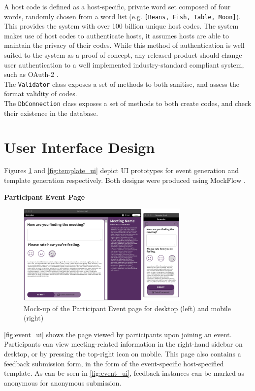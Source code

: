 \documentclass[9pt, titlepage]{extarticle}
\begin{document}
A host code is defined as a host-specific, private word set composed of four words, randomly chosen from a word list (e.g. \texttt{[Beans, Fish, Table, Moon]}). 
This provides the system with over 100 billion unique host codes. 
The system makes use of host codes to authenticate hosts, it assumes hosts are able to maintain the privacy of their codes.
While this method of authentication is well suited to the system as a proof of concept, any released product should change user authentication to a well implemented industry-standard compliant system, such as OAuth-2 \autocite{web:oauth}.\\

The \texttt{Validator} class exposes a set of methods to both sanitise, and assess the format validity of codes. \\
The \texttt{DbConnection} class exposes a set of methods to both create codes, and check their existence in the database.

\section{User Interface Design}

Figures \ref{fig:event_ui} and \ref{fig:template_ui} depict UI prototypes for event generation and template generation respectively. \newline
Both designs were produced using MockFlow \autocite{web:mockflow}. \newline

\textbf{Participant Event Page}
\begin{figure}[h]
\centering
\includegraphics[width=0.75\textwidth]{assets/Event.png}
\caption{Mock-up of the Participant Event page for desktop (left) and mobile (right)}

\label{fig:event_ui}
\end{figure}

\autoref{fig:event_ui} shows the page viewed by participants upon joining an event. Participants can view meeting-related information in the right-hand sidebar on desktop, or by pressing the top-right icon on mobile. This page also contains a feedback submission form, in the form of the event-specific host-specified template. As can be seen in \autoref{fig:event_ui}, feedback instances can be marked as anonymous for anonymous submission. \newline
\end{document}
